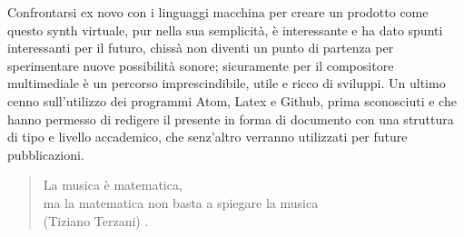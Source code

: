 \documentclass[
	a4paper,
	twocolumn
	]{article}
\begin{document}
Confrontarsi ex novo con i linguaggi macchina per creare un prodotto come questo
synth virtuale, pur nella sua semplicità, è interessante e ha dato spunti
interessanti per il futuro, chissà non diventi un punto di partenza per
sperimentare nuove possibilità sonore; sicuramente per il compositore
multimediale è un percorso imprescindibile, utile e ricco di sviluppi.
Un ultimo cenno sull'utilizzo dei programmi Atom, Latex e Github, prima
sconosciuti e che hanno permesso di redigere il presente in forma di
documento con una struttura di tipo e livello accademico, che senz'altro
verranno utilizzati per future pubblicazioni.

\begin{quote}
La musica è matematica, \\
ma la matematica non basta a spiegare la musica \\
(Tiziano Terzani) \cite{tizterz}.
\end{quote}
%




\vfill\null

\raggedright


\end{document}
